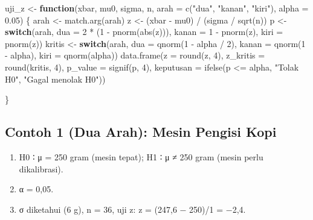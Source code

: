 \documentclass[
  indonesian,
  letterpaper,
]{book}
\newenvironment{Shaded}{\begin{snugshade}}{\end{snugshade}}
\newcommand{\AttributeTok}[1]{\textcolor[rgb]{0.40,0.45,0.13}{#1}}
\newcommand{\ControlFlowTok}[1]{\textcolor[rgb]{0.00,0.23,0.31}{\textbf{#1}}}
\newcommand{\DecValTok}[1]{\textcolor[rgb]{0.68,0.00,0.00}{#1}}
\newcommand{\FloatTok}[1]{\textcolor[rgb]{0.68,0.00,0.00}{#1}}
\newcommand{\FunctionTok}[1]{\textcolor[rgb]{0.28,0.35,0.67}{#1}}
\newcommand{\NormalTok}[1]{\textcolor[rgb]{0.00,0.23,0.31}{#1}}
\newcommand{\OtherTok}[1]{\textcolor[rgb]{0.00,0.23,0.31}{#1}}
\newcommand{\SpecialCharTok}[1]{\textcolor[rgb]{0.37,0.37,0.37}{#1}}
\newcommand{\StringTok}[1]{\textcolor[rgb]{0.13,0.47,0.30}{#1}}
\begin{document}
\begin{Shaded}
\begin{Highlighting}[]
\NormalTok{uji\_z }\OtherTok{\textless{}{-}} \ControlFlowTok{function}\NormalTok{(xbar, mu0, sigma, n, }\AttributeTok{arah =} \FunctionTok{c}\NormalTok{(}\StringTok{"dua"}\NormalTok{, }\StringTok{"kanan"}\NormalTok{, }\StringTok{"kiri"}\NormalTok{), }\AttributeTok{alpha =}
 \FloatTok{0.05}\NormalTok{) \{}
\NormalTok{arah }\OtherTok{\textless{}{-}} \FunctionTok{match.arg}\NormalTok{(arah)}
\NormalTok{z }\OtherTok{\textless{}{-}}\NormalTok{ (xbar }\SpecialCharTok{{-}}\NormalTok{ mu0) }\SpecialCharTok{/}\NormalTok{ (sigma }\SpecialCharTok{/} \FunctionTok{sqrt}\NormalTok{(n))}
\NormalTok{p }\OtherTok{\textless{}{-}} \ControlFlowTok{switch}\NormalTok{(arah, }\AttributeTok{dua =} \DecValTok{2} \SpecialCharTok{*}\NormalTok{ (}\DecValTok{1} \SpecialCharTok{{-}} \FunctionTok{pnorm}\NormalTok{(}\FunctionTok{abs}\NormalTok{(z))), }\AttributeTok{kanan =} \DecValTok{1} \SpecialCharTok{{-}} \FunctionTok{pnorm}\NormalTok{(z), }\AttributeTok{kiri =}
 \FunctionTok{pnorm}\NormalTok{(z))}
\NormalTok{kritis }\OtherTok{\textless{}{-}} \ControlFlowTok{switch}\NormalTok{(arah, }\AttributeTok{dua =} \FunctionTok{qnorm}\NormalTok{(}\DecValTok{1} \SpecialCharTok{{-}}\NormalTok{ alpha }\SpecialCharTok{/} \DecValTok{2}\NormalTok{), }\AttributeTok{kanan =} \FunctionTok{qnorm}\NormalTok{(}\DecValTok{1} \SpecialCharTok{{-}}\NormalTok{ alpha),}
 \AttributeTok{kiri =} \FunctionTok{qnorm}\NormalTok{(alpha))}
\FunctionTok{data.frame}\NormalTok{(}\AttributeTok{z =} \FunctionTok{round}\NormalTok{(z, }\DecValTok{4}\NormalTok{), }\AttributeTok{z\_kritis =} \FunctionTok{round}\NormalTok{(kritis, }\DecValTok{4}\NormalTok{), }\AttributeTok{p\_value =} \FunctionTok{signif}\NormalTok{(p, }\DecValTok{4}\NormalTok{),}
\AttributeTok{keputusan =} \FunctionTok{ifelse}\NormalTok{(p }\SpecialCharTok{\textless{}=}\NormalTok{ alpha, }\StringTok{"Tolak H0"}\NormalTok{, }\StringTok{"Gagal menolak H0"}\NormalTok{))}

\NormalTok{\}}
\end{Highlighting}
\end{Shaded}

\subsection{Contoh 1 (Dua Arah): Mesin Pengisi
Kopi}\label{contoh-1-dua-arah-mesin-pengisi-kopi}

\begin{enumerate}
\def\labelenumi{\arabic{enumi}.}
\item
  H0 ∶ μ = 250 gram (mesin tepat); H1 ∶ μ ≠ 250 gram (mesin perlu
  dikalibrasi).
\item
  α = 0,05.
\item
  σ diketahui (6 g), n = 36, uji z: z = (247,6 − 250)/1 = −2,4.
\end{enumerate}
\end{document}
